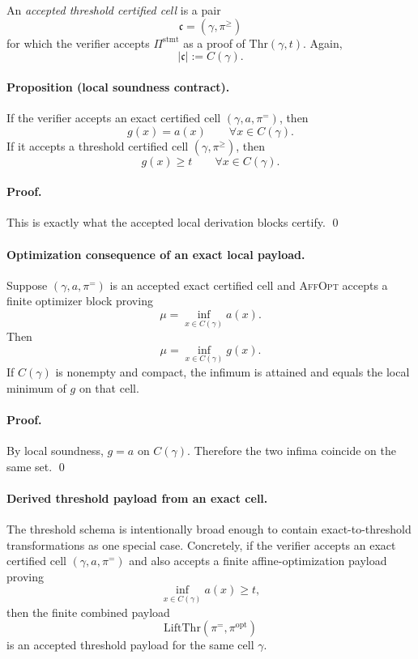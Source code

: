 An \emph{accepted threshold certified cell} is a pair
\[
\mathfrak c=(\gamma,\pi^{\ge})
\]
for which the verifier accepts $\Pi^{\mathrm{stmt}}$ as a proof of $\mathrm{Thr}(\gamma,t)$. Again,
\[
|\mathfrak c|:=C(\gamma).
\]

\paragraph{Proposition (local soundness contract).}
If the verifier accepts an exact certified cell $(\gamma,a,\pi^{=})$, then
\[
g(x)=a(x)
\qquad
\forall x\in C(\gamma).
\]
If it accepts a threshold certified cell $(\gamma,\pi^{\ge})$, then
\[
g(x)\ge t
\qquad
\forall x\in C(\gamma).
\]

\paragraph{Proof.}
This is exactly what the accepted local derivation blocks certify. \qed

\paragraph{Optimization consequence of an exact local payload.}
Suppose $(\gamma,a,\pi^{=})$ is an accepted exact certified cell and \textsc{AffOpt} accepts a finite optimizer block proving
\[
\mu = \inf_{x\in C(\gamma)} a(x).
\]
Then
\[
\mu = \inf_{x\in C(\gamma)} g(x).
\]
If $C(\gamma)$ is nonempty and compact, the infimum is attained and equals the local minimum of $g$ on that cell.

\paragraph{Proof.}
By local soundness, $g=a$ on $C(\gamma)$. Therefore the two infima coincide on the same set. \qed

\paragraph{Derived threshold payload from an exact cell.}
The threshold schema is intentionally broad enough to contain exact-to-threshold transformations as one special case. Concretely, if the verifier accepts an exact certified cell $(\gamma,a,\pi^{=})$ and also accepts a finite affine-optimization payload proving
\[
\inf_{x\in C(\gamma)} a(x)\ge t,
\]
then the finite combined payload
\[
\mathrm{LiftThr}(\pi^{=},\pi^{\mathrm{opt}})
\]
is an accepted threshold payload for the same cell $\gamma$.

